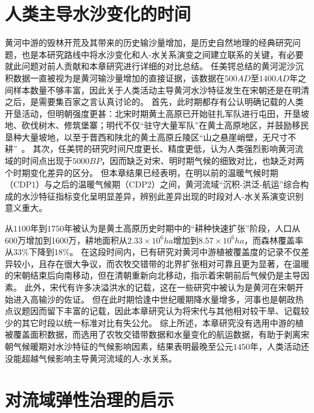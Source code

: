 \section{人类主导水沙变化的时间}

黄河中游的毁林开荒及其带来的历史输沙量增加，是历史自然地理的经典研究问题，也是本研究路线中将水沙变化和人-水关系演变之间建立联系的关键，有必要就此问题对前人贡献和本章研究进行详细的对比总结。
任美锷总结的黄河泥沙沉积数据一直被视为是黄河输沙量增加的直接证据\cite{renmeie2006}，该数据在$500AD$至$1400AD$年之间样本数量不够丰富，因此关于人类活动主导黄河水沙特征发生在宋朝还是在明清之后，是需要集百家之言认真讨论的。
首先，此时期都存有公认明确记载的人类开垦活动，但明朝强度更甚：北宋时期黄土高原已开始驻扎军队进行屯田，开垦坡地、砍伐树木、修筑堡寨；明代不仅“驻守大量军队”在黄土高原地区，并鼓励移民垦种大量坡地，以至于晋西和陕北的黄土高原丘陵区“山之悬崖峭壁，无尺寸不耕”~\cite{renmeie2006,wu2020a,shinianhai1985}。
其次，任美锷的研究时间尺度更长、精度更低，认为人类强烈影响黄河流域的时间点出现于$5000BP$，因而缺乏对宋、明时期气候的细致对比，也缺乏对两个时期变化差异的区分\cite{renmeie2006, mei-e1994}。
但本章结果已经表明，在明以前的温暖气候时期（CDP1）与之后的温暖气候期（CDP2）之间，黄河流域“沉积-洪泛-航运”综合构成的水沙特征指标变化呈明显差异，辨别此差异出现的时段对人-水关系演变识别意义重大。

从$1100$年到$1750$年被认为是黄土高原历史时期中的“耕种快速扩张”阶段，人口从600万增加到1600万，耕地面积从$2.33 \times 10^6 ha$增加到$8.57 \times 10^6 ha$，而森林覆盖率从$33\%$下降到$18\%$\cite{wu2020a}。
在这段时间内，已有研究对黄河中游植被覆盖度的记录不仅差异较小，且存在很大争议，而农牧交错带的北界扩张相对可靠且更为显著，在温暖的宋朝结束后向南移动，但在清朝重新向北移动，指示着宋朝前后气候仍是主导因素\cite{shinianhai1985,GeQuanSheng2011}。
此外，宋代有许多决溢洪水的记载，这在一些研究中被认为是黄河在宋朝开始进入高输沙的佐证\cite{chen2012}。
但在此时期恰逢中世纪暖期降水量增多，河事也是朝政热点议题因而留下丰富的记载，因此本章研究认为将宋代与其他相对较干旱、记载较少的其它时段以统一标准对比有失公允。
综上所述，本章研究没有选用中游的植被覆盖面积数据，而选用了农牧交错带数据和水量变化的航运数据，有助于剥离宋朝气候暖期对水沙特征的气候影响因素，结果表明最晚至公元$1450$年，人类活动还没能超越气候影响主导黄河流域的人-水关系。


\section{对流域弹性治理的启示}

